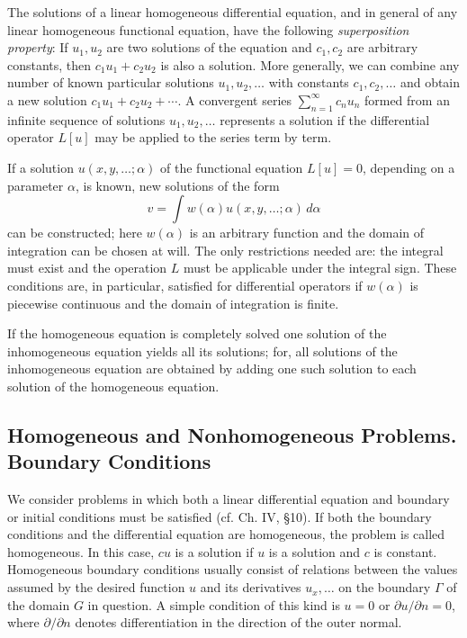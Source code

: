 The solutions of a linear homogeneous differential equation, and in general of any linear homogeneous functional equation, have the following \emph{superposition property}: If $u_1,u_2$ are two solutions of the equation and $c_1,c_2$ are arbitrary constants, then $c_1u_1+c_2u_2$ is also a solution. More generally, we can combine any number of known particular solutions $u_1,u_2,\ldots$ with constants $c_1,c_2,\ldots$ and obtain a new solution $c_1u_1+c_2u_2+\cdots$. A convergent series $\sum_{n=1}^{\infty}c_nu_n$ formed from an infinite sequence of solutions $u_1,u_2,\ldots$ represents a solution if the differential operator $L[u]$ may be applied to the series term by term.

If a solution $u(x,y,\ldots;\alpha)$ of the functional equation $L[u]=0$, depending on a parameter $\alpha$, is known, new solutions of the form
\[
v=\int w(\alpha)u(x,y,\ldots;\alpha)\,d\alpha
\]
can be constructed; here $w(\alpha)$ is an arbitrary function and the domain of integration can be chosen at will. The only restrictions needed are: the integral must exist and the operation $L$ must be applicable under the integral sign. These conditions are, in particular, satisfied for differential operators if $w(\alpha)$ is piecewise continuous and the domain of integration is finite.

If the homogeneous equation is completely solved one solution of the inhomogeneous equation yields all its solutions; for, all solutions of the inhomogeneous equation are obtained by adding one such solution to each solution of the homogeneous equation.

\subsection{Homogeneous and Nonhomogeneous Problems. Boundary Conditions}
We consider problems in which both a linear differential equation and boundary or initial conditions must be satisfied (cf. Ch. IV, \S10). If both the boundary conditions and the differential equation are homogeneous, the problem is called homogeneous. In this case, $cu$ is a solution if $u$ is a solution and $c$ is constant. Homogeneous boundary conditions usually consist of relations between the values assumed by the desired function $u$ and its derivatives $u_x,\ldots$ on the boundary $\Gamma$ of the domain $G$ in question. A simple condition of this kind is $u=0$ or $\partial u/\partial n=0$, where $\partial/\partial n$ denotes differentiation in the direction of the outer normal.

